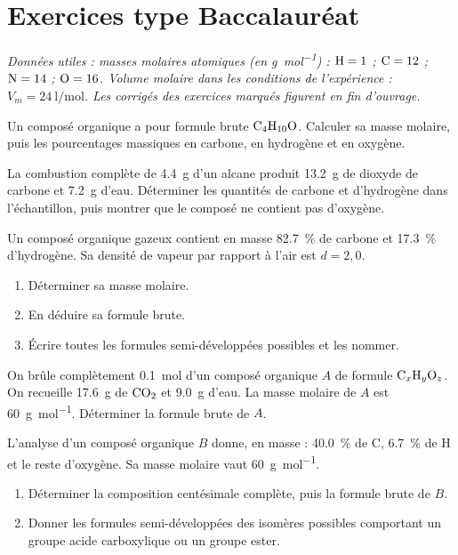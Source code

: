 \section{Exercices type Baccalauréat}
\textit{Données utiles : masses molaires atomiques (en \si{\gram\per\mol}) :
$\ce{H}=1$ ; $\ce{C}=12$ ; $\ce{N}=14$ ; $\ce{O}=16$. Volume molaire dans les
conditions de l'expérience : $V_m = \SI{24}{\litre\per\mol}$. Les corrigés des
exercices marqués  figurent en fin d'ouvrage.}


\exo{} Un composé organique a pour formule brute $\ce{C4H10O}$. Calculer sa
masse molaire, puis les pourcentages massiques en carbone, en hydrogène et en oxygène.

\exo{} La combustion complète de \SI{4.4}{\gram} d'un alcane produit
\SI{13.2}{\gram} de dioxyde de carbone et \SI{7.2}{\gram} d'eau. Déterminer les
quantités de carbone et d'hydrogène dans l'échantillon, puis montrer que le composé
ne contient pas d'oxygène.

\exo{} Un composé organique gazeux contient en masse \SI{82.7}{\percent} de
carbone et \SI{17.3}{\percent} d'hydrogène. Sa densité de vapeur par rapport à l'air
est $d = 2{,}0$.
\begin{enumerate}[label=\arabic*)]
\item Déterminer sa masse molaire.
\item En déduire sa formule brute.
\item Écrire toutes les formules semi-développées possibles et les nommer.
\end{enumerate}

\exo{} On brûle complètement \SI{0.1}{\mol} d'un composé organique $A$ de
formule $\ce{C_xH_yO_z}$. On recueille \SI{17.6}{\gram} de $\ce{CO2}$ et
\SI{9.0}{\gram} d'eau. La masse molaire de $A$ est \SI{60}{\gram\per\mol}.
Déterminer la formule brute de $A$.

\exo{} L'analyse d'un composé organique $B$ donne, en masse :
\SI{40.0}{\percent} de C, \SI{6.7}{\percent} de H et le reste d'oxygène. Sa masse
molaire vaut \SI{60}{\gram\per\mol}.
\begin{enumerate}[label=\arabic*)]
\item Déterminer la composition centésimale complète, puis la formule brute de $B$.
\item Donner les formules semi-développées des isomères possibles comportant un
groupe acide carboxylique ou un groupe ester.
\end{enumerate}

